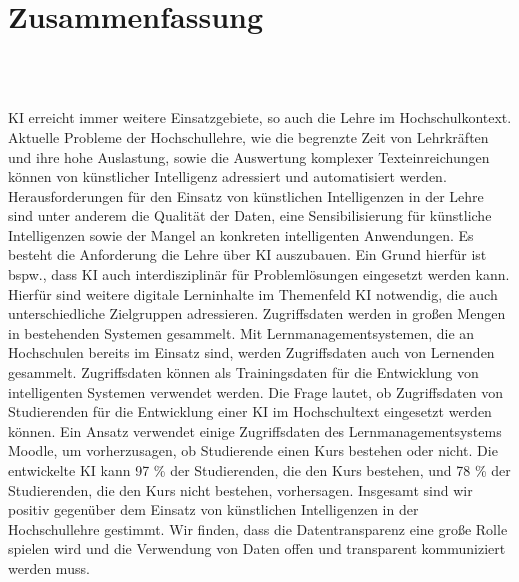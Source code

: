 \chapter*{Zusammenfassung}
\begin{center}
  \DocumentThesisTitle
  \\
  \vspace{.3cm}
  \DocumentAuthorPrename\ \DocumentAuthorName
\end{center}
\ac{KI} erreicht immer weitere Einsatzgebiete, so auch die Lehre im Hochschulkontext. Aktuelle Probleme der Hochschullehre, wie die begrenzte Zeit von Lehrkräften und ihre hohe Auslastung, sowie die Auswertung komplexer Texteinreichungen können von künstlicher Intelligenz adressiert und automatisiert werden. Herausforderungen für den Einsatz von künstlichen Intelligenzen in der Lehre sind unter anderem die Qualität der Daten, eine Sensibilisierung für künstliche Intelligenzen sowie der Mangel an konkreten intelligenten Anwendungen. Es besteht die Anforderung die Lehre über \ac{KI} auszubauen. Ein Grund hierfür ist bspw., dass \ac{KI} auch interdisziplinär für Problemlösungen eingesetzt werden kann. Hierfür sind weitere digitale Lerninhalte im Themenfeld \ac{KI} notwendig, die auch unterschiedliche Zielgruppen adressieren. Zugriffsdaten werden in großen Mengen in bestehenden Systemen gesammelt. Mit Lernmanagementsystemen, die an Hochschulen bereits im Einsatz sind, werden Zugriffsdaten auch von Lernenden gesammelt. Zugriffsdaten können als Trainingsdaten für die Entwicklung von intelligenten Systemen verwendet werden. Die Frage lautet, ob Zugriffsdaten von Studierenden für die Entwicklung einer \ac{KI} im Hochschultext eingesetzt werden können. Ein Ansatz verwendet einige Zugriffsdaten des Lernmanagementsystems Moodle, um vorherzusagen, ob Studierende einen Kurs bestehen oder nicht. Die entwickelte \ac{KI} kann 97 \% der Studierenden, die den Kurs bestehen, und 78 \% der Studierenden, die den Kurs nicht bestehen, vorhersagen. Insgesamt sind wir positiv gegenüber dem Einsatz von künstlichen Intelligenzen in der Hochschullehre gestimmt. Wir finden, dass die Datentransparenz eine große Rolle spielen wird und die Verwendung von Daten offen und transparent kommuniziert werden muss.

\newpage


